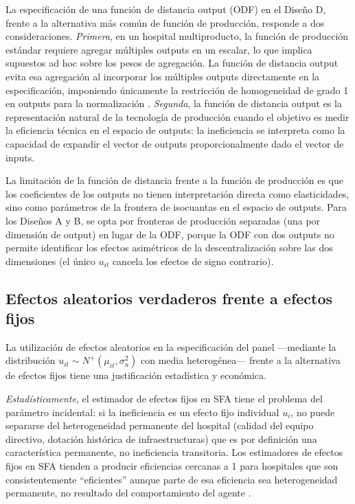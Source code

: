 \documentclass[12pt, a4paper, twoside, openright]{book}
\theoremstyle{plain}
\theoremstyle{definition}
\theoremstyle{remark}
\begin{document}
La especificación de una función de distancia output (ODF) en el Diseño D, frente a la alternativa más común de función de producción, responde a dos consideraciones. \textit{Primera}, en un hospital multiproducto, la función de producción estándar requiere agregar múltiples outputs en un escalar, lo que implica supuestos ad hoc sobre los pesos de agregación. La función de distancia output evita esa agregación al incorporar los múltiples outputs directamente en la especificación, imponiendo únicamente la restricción de homogeneidad de grado 1 en outputs para la normalización \citep{coelli1999,grosskopf1987}. \textit{Segunda}, la función de distancia output es la representación natural de la tecnología de producción cuando el objetivo es medir la eficiencia técnica en el espacio de outputs: la ineficiencia se interpreta como la capacidad de expandir el vector de outputs proporcionalmente dado el vector de inputs.

La limitación de la función de distancia frente a la función de producción es que los coeficientes de los outputs no tienen interpretación directa como elasticidades, sino como parámetros de la frontera de isocuantas en el espacio de outputs. Para los Diseños A y B, se opta por fronteras de producción separadas (una por dimensión de output) en lugar de la ODF, porque la ODF con dos outputs no permite identificar los efectos asimétricos de la descentralización sobre las dos dimensiones (el único $u_{it}$ cancela los efectos de signo contrario).

\subsection{Efectos aleatorios verdaderos frente a efectos fijos}

La utilización de efectos aleatorios en la especificación del panel ---mediante la distribución $u_{it} \sim N^+(\mu_{it}, \sigma_u^2)$ con media heterogénea--- frente a la alternativa de efectos fijos tiene una justificación estadística y económica.

\textit{Estadísticamente}, el estimador de efectos fijos en SFA tiene el problema del parámetro incidental: si la ineficiencia es un efecto fijo individual $u_i$, no puede separarse del heterogeneidad permanente del hospital (calidad del equipo directivo, dotación histórica de infraestructuras) que es por definición una característica permanente, no ineficiencia transitoria. Los estimadores de efectos fijos en SFA tienden a producir eficiencias cercanas a 1 para hospitales que son consistentemente ``eficientes'' aunque parte de esa eficiencia sea heterogeneidad permanente, no resultado del comportamiento del agente \citep{greene2005a}.
\end{document}
